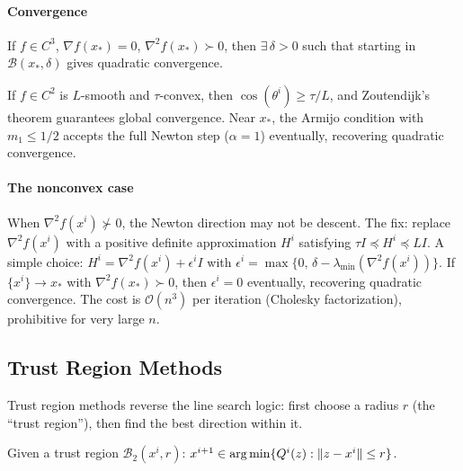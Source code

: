 \paragraph{Convergence}

\begin{thm}\label{thm:newton-quad}
	If $f \in C^3$, $\nabla f(x_*) = 0$, $\nabla^2 f(x_*) \succ 0$, then $\exists\, \delta > 0$ such that starting in $\mathcal{B}(x_*, \delta)$ gives quadratic convergence.
\end{thm}

\begin{thm}\label{thm:newton-global}
	If $f \in C^2$ is $L$-smooth and $\tau$-convex, then $\cos(\theta^i) \geq \tau/L$, and Zoutendijk's theorem guarantees global convergence.
	Near $x_*$, the Armijo condition with $m_1 \leq 1/2$ accepts the full Newton step ($\alpha = 1$) eventually, recovering quadratic convergence.
\end{thm}

\paragraph{The nonconvex case}

When $\nabla^2 f(x^i) \not\succ 0$, the Newton direction may not be descent.
The fix: replace $\nabla^2 f(x^i)$ with a positive definite approximation $H^i$ satisfying $\tau I \preceq H^i \preceq LI$.
A simple choice: $H^i = \nabla^2 f(x^i) + \epsilon^i I$ with $\epsilon^i = \max\{0,\, \delta - \lambda_{\min}(\nabla^2 f(x^i))\}$.
If $\{x^i\} \to x_*$ with $\nabla^2 f(x_*) \succ 0$, then $\epsilon^i = 0$ eventually, recovering quadratic convergence.
The cost is $\mathcal{O}(n^3)$ per iteration (Cholesky factorization), prohibitive for very large $n$.


\subsection{Trust Region Methods}\label{ssec:trust-region}

Trust region methods reverse the line search logic: first choose a radius $r$ (the ``trust region''), then find the best direction within it.

\begin{defn}\label{def:trust-region}
	Given a trust region $\mathcal{B}_2(x^i, r)$:
	$x^{i+1} \in \operatorname*{arg\,min}\{Q^i(z) : \lVert z - x^i\rVert \leq r\}$.
\end{defn}

